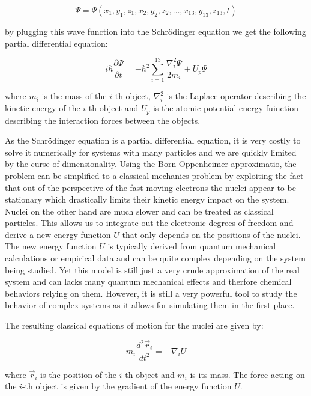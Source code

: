 \begin{equation}
      \Psi = \Psi(x_1, y_1, z_1, x_2, y_2, z_2, \ldots, x_{13}, y_{13}, z_{13}, t)
\end{equation}

by plugging this wave function into the Schrödinger equation we get the following partial differential equation:

\begin{equation}
      i \hbar \frac{\partial \Psi}{\partial t} = -\hbar^2 \sum_{i=1}^{13} \frac{\nabla_i^2 \Psi}{2m_i} + U_p \Psi
\end{equation}

where $m_i$ is the mass of the $i$-th object, $\nabla_i^2$ is the Laplace operator describing the kinetic energy of the $i$-th object and $U_p$ is the atomic potential energy fuinction describing the interaction forces between the objects.

As the Schrödinger equation is a partial differential equation, it is very costly to solve it numerically for systems with many particles and we are quickly limited by the curse of dimensionality. Using the Born-Oppenheimer approximatio, the problem can be simplified to a classical mechanics problem by exploiting the fact that out of the perspective of the fast moving electrons the nuclei appear to be stationary which drastically limits their kinetic energy impact on the system. Nuclei on the other hand are much slower and can be treated as classical particles. This allows us to integrate out the electronic degrees of freedom and derive a new energy function $U$ that only depends on the positions of the nuclei. The new energy function $U$ is typically derived from quantum mechanical calculations or empirical data and can be quite complex depending on the system being studied. Yet this model is still just a very crude approximation of the real system and can lacks many quantum mechanical effects and therfore chemical behaviors relying on them.
However, it is still a very powerful tool to study the behavior of complex systems as it allows for simulating them in the first place.

The resulting classical equations of motion for the nuclei are given by: 

\begin{equation}
      m_i \frac{d^2 \vec{r}_i}{dt^2} = -\nabla_i U
\end{equation}

where $\vec{r}_i$ is the position of the $i$-th object and $m_i$ is its mass. The force acting on the $i$-th object is given by the gradient of the energy function $U$.

